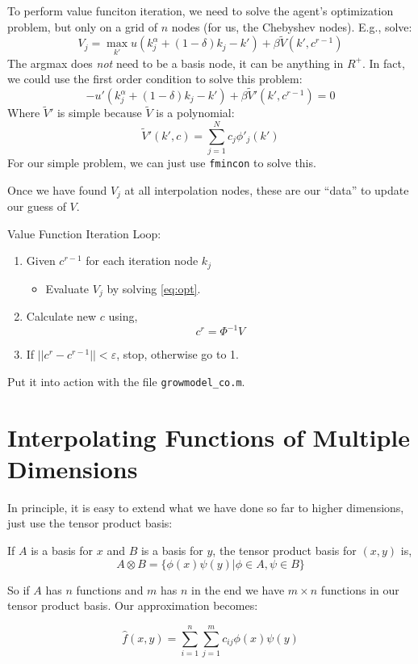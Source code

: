 \documentclass[twoside]{article}
\begin{document}
To perform value funciton iteration, we need to solve the agent's optimization problem, but only on a grid of $n$ nodes (for us, the Chebyshev nodes). E.g., solve: 
\begin{equation} \label{eq:opt}
V_j = \max_{k'} u(k_j^\alpha + (1-\delta)k_j - k') + \beta \tilde{V}(k', c^{r-1})
\end{equation}
The argmax does \emph{not} need to be a basis node, it can be anything in $R^+$. In fact, we could use the first order condition to solve this problem: 
$$ -u'(k_j^\alpha + (1- \delta)k_j - k') + \beta \tilde{V}'(k', c^{r-1}) = 0 $$
Where $\tilde{V}'$ is simple because $\tilde{V}$ is a polynomial: 
$$ \tilde{V}'(k', c) = \sum_{j=1}^N c_j \phi'_j(k') $$
For our simple problem, we can just use {\tt fmincon} to solve this. 

Once we have found $V_j$ at all interpolation nodes, these are our ``data'' to update our guess of $V$. 

Value Function Iteration Loop: 
\begin{enumerate}
\item Given $c^{r-1}$ for each iteration node $k_j$
\begin{itemize}
\item Evaluate $V_j$ by solving \eqref{eq:opt}. 
\end{itemize}
\item Calculate new $c$ using, 
$$ c^r = \Phi^{-1}V$$
\item If $||c^r - c^{r-1}|| < \varepsilon$, stop, otherwise go to 1. 
\end{enumerate}
 
Put it into action with the file {\tt growmodel\_co.m}.  
 
\section{Interpolating Functions of Multiple Dimensions}

In principle, it is easy to extend what we have done so far to higher dimensions, just use the tensor product basis: 

If $A$ is a basis for $x$ and $B$ is a basis for $y$, the tensor product basis for $(x, y)$ is, 
$$ A \otimes B = \{ \phi(x)\psi(y) | \phi \in A, \psi \in B \}$$
 
So if $A$ has $n$ functions and $m$ has $n$ in the end we have $m \times n$ functions in our tensor product basis. Our approximation becomes: 

$$\hat{f}(x, y) = \sum_{i=1}^n \sum_{j=1}^m c_{ij} \phi(x) \psi(y) $$
\end{document}

